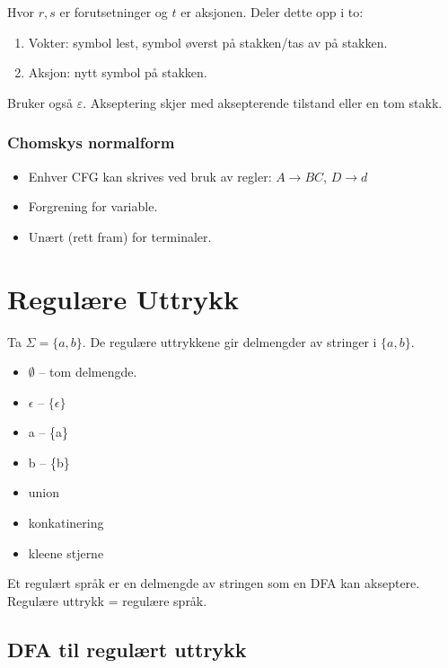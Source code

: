 \documentclass[11pt,a4paper]{article}
\begin{document}
Hvor $r,s$ er forutsetninger og $t$ er aksjonen. Deler dette opp i to:
\begin{enumerate}
	\item{Vokter: symbol lest, symbol øverst på stakken/tas av på stakken.}
	\item{Aksjon: nytt symbol på stakken.}
\end{enumerate}

Bruker også $\varepsilon$. Akseptering skjer med aksepterende tilstand eller en tom stakk.

\subsubsection{Chomskys normalform}
\begin{itemize}
	\item{Enhver CFG kan skrives ved bruk av regler: $A \longrightarrow BC$, $D \longrightarrow d$}
	\item{Forgrening for variable.}
	\item{Unært (rett fram) for terminaler.}
\end{itemize}

\section{Regulære Uttrykk}
Ta $\Sigma = \{a,b\}$. De regulære uttrykkene gir delmengder av stringer i $\{a, b\}$.
\begin{itemize}
	\item{$\emptyset$ -- tom delmengde.}
	\item{$\epsilon$ -- $\{\epsilon\}$}
	\item{a -- \{a\}}
	\item{b -- \{b\}}
	\item{union}
	\item{konkatinering}
	\item{kleene stjerne}
\end{itemize}

Et regulært språk er en delmengde av stringen som en DFA kan akseptere. Regulære uttrykk = regulære språk.

\subsection{DFA til regulært uttrykk}

\begin{figure}[h!]
\centering
{}
\end{figure}
\end{document}
